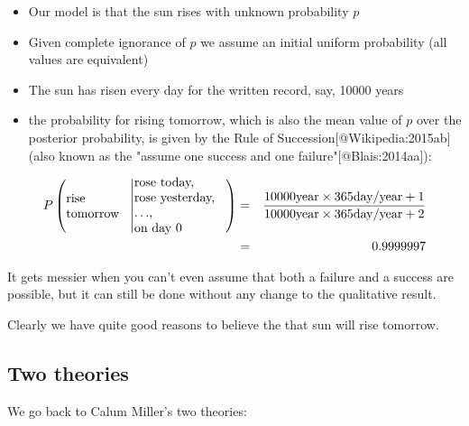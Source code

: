 \documentclass{tufte-book}
\begin{document}
\begin{itemize}
\itemsep1pt\parskip0pt
\item
  Our model is that the sun rises with unknown probability $p$
\item
  Given complete ignorance of $p$ we assume an initial uniform
  probability (all values are equivalent)
\item
  The sun has risen every day for the written record, say, 10000 years
\item
  the probability for rising tomorrow, which is also the mean value of
  $p$ over the posterior probability, is given by the Rule of
  Succession[@Wikipedia:2015ab] (also known as the "assume one success and one
  failure"[@Blais:2014aa]):
\end{itemize}

\newcommand{\yr}{\mbox{year}}
\renewcommand{\day}{\mbox{day}}

\begin{eqnarray*}
P\left(\parbox{.7in}{rise\\tomorrow}\middle|\parbox{1in}{rose today,\\rose yesterday, \\$\ldots$,\\ on day 0}\right)&=&
\frac{10000 \yr \times 365 \day/\yr+1}{10000 \yr \times 365 \day/\yr+2}\\
&=&0.9999997
\end{eqnarray*}

It gets messier when you can't even assume that both a failure and a
success are possible, but it can still be done without any change to the
qualitative result.

Clearly we have quite good reasons to believe the that sun will rise
tomorrow.

\subsection{Two theories}\label{two-theories}

We go back to Calum Miller's two theories:

\end{document}
